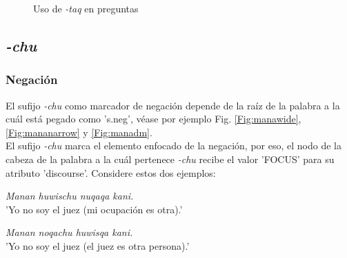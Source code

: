 \documentclass[a4paper,11pt,DIV12]{scrartcl}
\begin{document}
\begin{figure}
\begin{center}
 \caption{Uso de {\em -taq} en preguntas}\label{Fig:taqintr}
\end{center}
\end{figure}

\subsection{{\em-chu}}

\subsubsection{Negaci\'on}\label{Sec:chunegacion}
El sufijo {\em -chu} como marcador de negaci\'on depende de la ra\'iz de la palabra a la cu\'al est\'a pegado como 's.neg', v\'ease por ejemplo Fig. \ref{Fig:manawide}, \ref{Fig:mananarrow} y \ref{Fig:manadm}.\\
El sufijo {\em -chu} marca el elemento enfocado de la negaci\'on, por eso, el nodo de la cabeza de la palabra a la cu\'al pertenece {\em -chu} recibe el valor 'FOCUS' para su atributo 'discourse'. Considere estos dos ejemplos:

\begin{examples}
\item {\em Manan huwischu nuqaqa kani.}\\
      'Yo no soy el juez (mi ocupaci\'on es otra).'
\item {\em Manan noqachu huwisqa kani.}\\
     'Yo no soy el juez (el juez es otra persona).'\\
	\hfill{\small \citep[92]{Cusi2}}
\end{examples}
\end{document}
